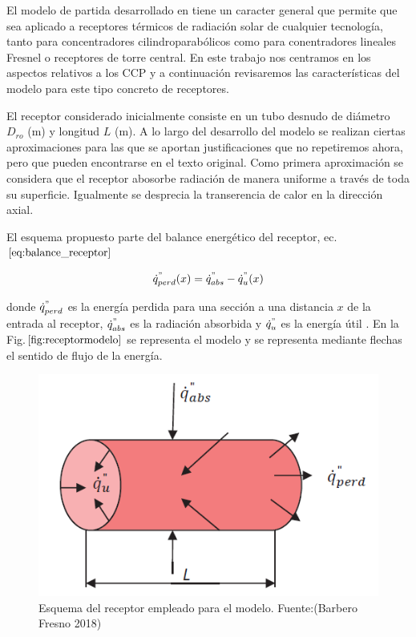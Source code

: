 \documentclass[11pt]{article}
\begin{document}
El modelo de partida desarrollado en \cite{1022085/7TD8VTGL} tiene un
caracter general que permite que sea aplicado a receptores térmicos de
radiación solar de cualquier tecnología, tanto para concentradores
cilindroparabólicos como para conentradores lineales Fresnel o
receptores de torre central. En este trabajo nos centramos en los
aspectos relativos a los CCP y a continuación revisaremos las
características del modelo para este tipo concreto de receptores.

El receptor considerado inicialmente consiste en un tubo desnudo de
diámetro \(D_{ro}\) (m) y longitud \(L\) (m). A lo largo del desarrollo
del modelo se realizan ciertas aproximaciones para las que se aportan
justificaciones que no repetiremos ahora, pero que pueden encontrarse en
el texto original. Como primera aproximación se considera que el
receptor abosorbe radiación de manera uniforme a través de toda su
superficie. Igualmente se desprecia la transerencia de calor en la
dirección axial.

El esquema propuesto parte del balance energético del receptor,
ec.\(\eqref{eq:balance_receptor}\)

\begin{equation}
    \dot{q}^{"}_{perd}(x) = \dot{q}^{"}_{abs}-\dot{q}^{"}_{u}(x) \label{eq:balance_receptor}
\end{equation}

donde \(\dot{q}^{"}_{perd}\) es la energía perdida para una sección a
una distancia \(x\) de la entrada al receptor, \(\dot{q}^{"}_{abs}\) es
la radiación absorbida y \(\dot{q}^{"}_{u}\) es la energía útil . En la
Fig.\(\ref{fig:receptormodelo}\) se representa el modelo y se representa
mediante flechas el sentido de flujo de la energía.

\begin{figure}
\includegraphics[scale=0.8]{images/receptor_para_modelo.png}
\caption{Esquema del receptor empleado para el modelo. Fuente:(Barbero Fresno 2018)} 
\label{fig:receptormodelo}
\end{figure}
\end{document}
